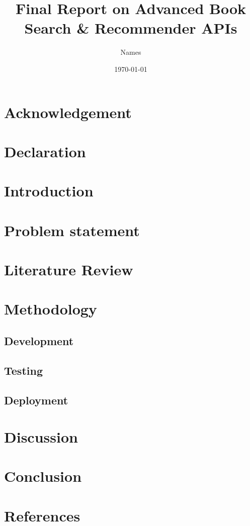 \documentclass{article}
\title{Final Report on Advanced Book Search \& Recommender APIs}
\author{Names}
\date{\today}
\begin{document}
\maketitle

\newpage

\begin{abstract}
    
\end{abstract}

\newpage

\section*{Acknowledgement}
    
\newpage

\section*{Declaration}
    
\newpage

\tableofcontents
\newpage

\section{Introduction}
    

\section{Problem statement}
    

\section{Literature Review}
    

\section{Methodology}
    

\subsection{Development}
    

\subsection{Testing}
    

\newpage

\subsection{Deployment}
    

\section{Discussion}
    

\section{Conclusion}
    


\section{References}
\end{document}
